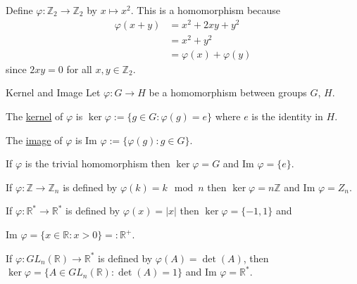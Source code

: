 \documentclass[12pt]{article}
\newcommand{\R}{\mathbb{R}}
\newcommand{\Z}{\mathbb{Z}}
\renewcommand{\Im}{\text{Im }}
\begin{document}
	\begin{myex}{}{}
		Define $\varphi:\Z_2\to\Z_2$ by $x\mapsto x^2$. This is a homomorphism because
		\begin{align*}
			\varphi(x+y)&=x^2+2xy+y^2\\
			&=x^2+y^2\\
			&=\varphi(x)+\varphi(y)
		\end{align*}
		since $2xy=0$ for all $x, y\in\Z_2$.
	\end{myex}
	
	\begin{mydef}{Kernel and Image}{}
		Let $\varphi:G\to H$ be a homomorphism between groups $G$, $H$.
		
		The \underline{kernel} of $\varphi$ is $\ker\varphi:=\{g\in G:\varphi(g)=e\}$ where $e$ is the identity in $H$.
		
		The \underline{image} of $\varphi$ is $\Im\varphi:=\{\varphi(g):g\in G\}$.
	\end{mydef}
	
	\begin{myex}{}{}
		If $\varphi$ is the trivial homomorphism then $\ker\varphi=G$ and $\Im\varphi=\{e\}$.
	\end{myex}
	
	\begin{myex}{}{}
		If $\varphi:\Z\to\Z_n$ is defined by $\varphi(k)=k\mod n$ then $\ker\varphi=n\Z$ and $\Im\varphi=Z_n$.
	\end{myex}
	
	\begin{myex}{}{}
		If $\varphi:\R^*\to\R^*$ is defined by $\varphi(x)=|x|$ then $\ker\varphi=\{-1, 1\}$ and
		
		$\Im\varphi=\{x\in\R:x>0\}=:\R^+$.
	\end{myex}
	
	\begin{myex}{}{}
		If $\varphi:GL_n(\R)\to\R^*$ is defined by $\varphi(A)=\det(A)$, then $\ker\varphi=\{A\in GL_n(\R):\det(A)=1\}$ and $\Im\varphi=\R^*$.
	\end{myex}
	
\end{document}

